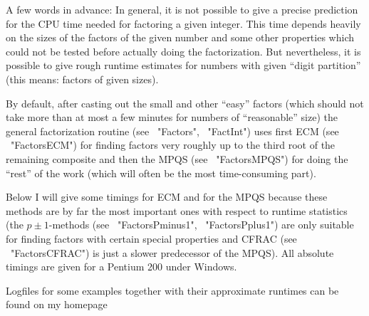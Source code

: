 


A few words in advance: In general, it is not possible to give a precise
prediction for the CPU time needed for factoring a given integer.
This time depends heavily on the sizes of the factors of the given number
and some other properties which could not be tested before actually
doing the factorization.
But nevertheless, it is possible to give rough runtime estimates for
numbers with given ``digit partition'' (this means: factors of given
sizes).

By default, after casting out the small and other ``easy'' factors
(which should not take more than at most a few minutes for numbers of
``reasonable'' size) the general factorization routine 
(see ~"Factors", ~"FactInt") uses first ECM (see ~"FactorsECM") for
finding factors very roughly up to the third root of the remaining
composite and then the MPQS (see ~"FactorsMPQS") for doing the ``rest''
of the work (which will often be the most time-consuming part).

Below I will give some timings for ECM and for the MPQS because
these methods are by far the most important ones with respect to
runtime statistics (the $p \pm 1$-methods (see ~"FactorsPminus1",
~"FactorsPplus1") are only suitable for finding factors with certain
special properties and CFRAC (see ~"FactorsCFRAC") is just a slower
predecessor of the MPQS). All absolute timings are given for a
Pentium 200 under Windows.

Logfiles for some examples together with their approximate runtimes
can be found on my homepage 


